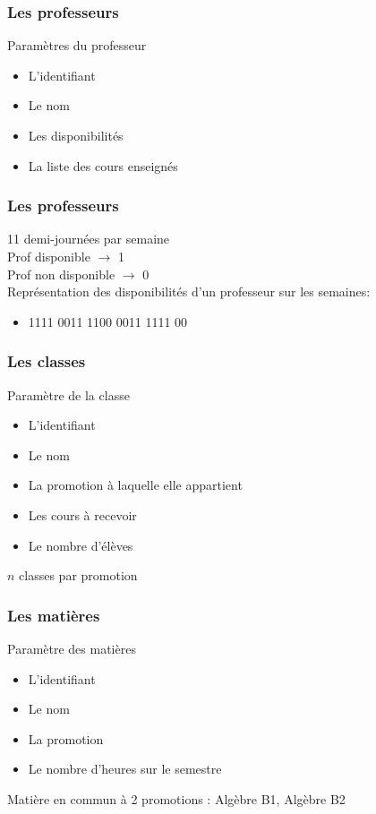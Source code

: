 \documentclass{beamer}
\begin{document}
\begin{frame} 
\frametitle{Les professeurs}
\begin{block}{Paramètres du professeur}
\begin{itemize}
\item L'identifiant
\item Le nom
\item Les disponibilités
\item La liste des cours enseignés
\end{itemize}
\end{block}
\end{frame}

\begin{frame}
\frametitle{Les professeurs}
11 demi-journées par semaine\\

Prof disponible  $\rightarrow$ 1\\
Prof non disponible  $\rightarrow$ 0\\
\vspace{\baselineskip}
Représentation des disponibilités d'un professeur sur les semaines:
\begin{itemize}
\item 1111 0011 1100 0011 1111 00
\end{itemize}
\end{frame}

\begin{frame}
\frametitle{Les classes}
\begin{block}{Paramètre de la classe}
\begin{itemize}
\item L'identifiant
\item Le nom
\item La promotion à laquelle elle appartient
\item Les cours à recevoir
\item Le nombre d'élèves\\
\end{itemize}
\end{block}
\vspace{\baselineskip}
$n$ classes par promotion
\end{frame}

\begin{frame}
\frametitle{Les matières}
\begin{block}{Paramètre des matières}
\begin{itemize}
\item L'identifiant
\item Le nom
\item La promotion
\item Le nombre d'heures sur le semestre\\
\end{itemize}
\end{block}
\vspace{\baselineskip}
Matière en commun à 2 promotions : Algèbre B1, Algèbre B2\\ 
\end{frame}
\end{document}

